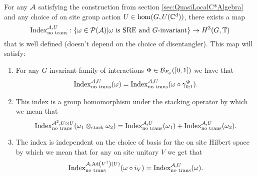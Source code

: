 \documentclass[11pt,a4paper,twoside]{article}
\numberwithin{equation}{section}
\begin{document}
\begin{theorem}\label{thrm:ExistenceOriginalIndex}
	For any $\AA$ satisfying the construction from section \ref{sec:QuasiLocalC*Algebra} and any choice of on site group action $U\in\hom(G,U(\CC^d))$, there exists a map
	\begin{equation}
		\textrm{Index}^{\AA,U}_{\text{no trans}}:\{\omega\in\PP(\AA)| \omega\text{ is SRE and }G\text{-invariant}\}\rightarrow H^3(G,\TT)
	\end{equation}
	that is well defined (doesn't depend on the choice of disentangler). This map will satisfy:
	\begin{enumerate}
		\item For any $G$ invariant family of interactions $\Phi\in\BB_{F_\phi}([0,1])$ we have that
		\begin{equation}
			\textrm{Index}^{\AA,U}_{\text{no trans}}(\omega)=\textrm{Index}^{\AA,U}_{\text{no trans}}(\omega\circ\gamma^\Phi_{0;1}).
		\end{equation}
		\item This index is a group homomorphism under the stacking operator by which we mean that
		\begin{equation}
			\textrm{Index}_{\text{no trans}}^{\AA^2,U\otimes U}(\omega_1\otimes_{\text{stack}}\omega_2)=\textrm{Index}_{\text{no trans}}^{\AA,U}(\omega_1)+\textrm{Index}_{\text{no trans}}^{\AA,U}(\omega_2).
		\end{equation}
		\item The index is independent on the choice of basis for the on site Hilbert space by which we mean that for any on site unitary $V$ we get that
		\begin{equation}
			\textrm{Index}^{\AA,\Ad{V^\dagger}(U)}_{\text{no trans}}(\omega\circ i_V) =\textrm{Index}^{\AA,U}_{\text{no trans}}(\omega).
		\end{equation}
	\end{enumerate}
\end{theorem}
\end{document}

